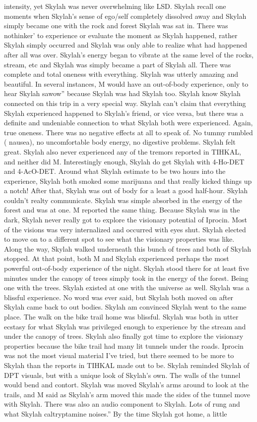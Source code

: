 \documentclass[12pt]{book}
\begin{document}
intensity, yet Skylah was never overwhelming like LSD. Skylah recall one moments when Skylah's sense of ego/self completely dissolved away and Skylah simply became one with the rock and forest Skylah was sat in. There was nothinker' to experience or evaluate the moment as Skylah happened, rather Skylah simply occurred and Skylah was only able to realize what had happened after all was over. Skylah's energy began to vibrate at the same level of the rocks, stream, etc and Skylah was simply became a part of Skylah all. There was complete and total oneness with everything. Skylah was utterly amazing and beautiful. In several instances, M would have an out-of-body experience, only to hear Skylah sawow'' because Skylah was had Skylah too. Skylah know Skylah connected on this trip in a very special way. Skylah can't claim that everything Skylah experienced happened to Skylah's friend, or vice versa, but there was a definite and undeniable connection to what Skylah both were experienced. Again, true oneness. There was no negative effects at all to speak of. No tummy rumbled ( nausea), no uncomfortable body energy, no digestive problems. Skylah felt great. Skylah also never experienced any of the tremors reported in TIHKAL, and neither did M. Interestingly enough, Skylah do get Skylah with 4-Ho-DET and 4-AcO-DET. Around what Skylah estimate to be two hours into the experience, Skylah both smoked some marijuana and that really kicked things up a notch! After that, Skylah was out of body for a least a good half-hour. Skylah couldn't realty communicate. Skylah was simple absorbed in the energy of the forest and was at one. M reported the same thing. Because Skylah was in the dark, Skylah never really got to explore the visionary potential of Iprocin. Most of the visions was very internalized and occurred with eyes shut. Skylah elected to move on to a different spot to see what the visionary properties was like. Along the way, Skylah walked underneath this bunch of trees and both of Skylah stopped. At that point, both M and Skylah experienced perhaps the most powerful out-of-body experience of the night. Skylah stood there for at least five minutes under the canopy of trees simply took in the energy of the forest. Being one with the trees. Skylah existed at one with the universe as well. Skylah was a blissful experience. No word was ever said, but Skylah both moved on after Skylah came back to out bodies. Skylah am convinced Skylah went to the same place. The walk on the bike trail home was blissful. Skylah was both in utter ecstasy for what Skylah was privileged enough to experience by the stream and under the canopy of trees. Skylah also finally got time to explore the visionary properties because the bike trail had many lit tunnels under the roads. Iprocin was not the most visual material I've tried, but there seemed to be more to Skylah than the reports in TIHKAL made out to be. Skylah reminded Skylah of DPT visuals, but with a unique look of Skylah's own. The walls of the tunnel would bend and contort. Skylah was moved Skylah's arms around to look at the trails, and M said as Skylah's arm moved this made the sides of the tunnel move with Skylah. There was also an audio component to Skylah. Lots of rung and what Skylah caltryptamine noises.'' By the time Skylah got home, a little 
\end{document}
